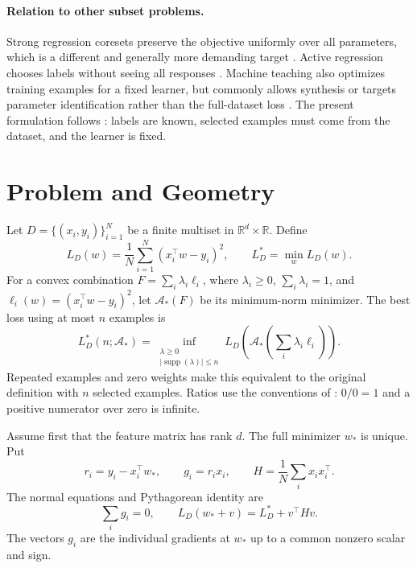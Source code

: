 \documentclass[twoside]{article}
\newcommand{\R}{\mathbb R}
\newcommand{\cA}{\mathcal A}
\newcommand{\supp}{\operatorname{supp}}
\begin{document}
\paragraph{Relation to other subset problems.}
Strong regression coresets preserve the objective uniformly over all parameters, which is a different and generally more demanding target \citep{boutsidis2013coresets,feldman2020coresets}. Active regression chooses labels without seeing all responses \citep{chen2019active}. Machine teaching also optimizes training examples for a fixed learner, but commonly allows synthesis or targets parameter identification rather than the full-dataset loss \citep{ma2018teacher}. The present formulation follows \citet{hanneke2025data}: labels are known, selected examples must come from the dataset, and the learner is fixed.

\section{Problem and Geometry}

Let $D=\{(x_i,y_i)\}_{i=1}^N$ be a finite multiset in $\R^d\times\R$. Define
\begin{equation}
 L_D(w)=\frac1N\sum_{i=1}^N(x_i^\top w-y_i)^2,
 \qquad L_D^*=\min_w L_D(w).
\end{equation}
For a convex combination $F=\sum_i\lambda_i\ell_i$, where $\lambda_i\geq0$, $\sum_i\lambda_i=1$, and $\ell_i(w)=(x_i^\top w-y_i)^2$, let $\cA_*(F)$ be its minimum-norm minimizer. The best loss using at most $n$ examples is
\begin{equation}
 L_D^*(n;\cA_*)=
 \inf_{\substack{\lambda\geq0\\|\supp(\lambda)|\leq n}}
 L_D\!\left(\cA_*\!\left(\sum_i\lambda_i\ell_i\right)\right).
 \label{eq:selected}
\end{equation}
Repeated examples and zero weights make this equivalent to the original definition with $n$ selected examples. Ratios use the conventions of \citet{hanneke2025data}: $0/0=1$ and a positive numerator over zero is infinite.

Assume first that the feature matrix has rank $d$. The full minimizer $w_*$ is unique. Put
\begin{equation}
 r_i=y_i-x_i^\top w_* ,\qquad g_i=r_i x_i,
 \qquad H=\frac1N\sum_i x_ix_i^\top.
 \label{eq:residual-gradient}
\end{equation}
The normal equations and Pythagorean identity are
\begin{equation}
 \sum_i g_i=0,\qquad
 L_D(w_*+v)=L_D^*+v^\top Hv.
 \label{eq:pythagorean}
\end{equation}
The vectors $g_i$ are the individual gradients at $w_*$ up to a common nonzero scalar and sign.
\end{document}
